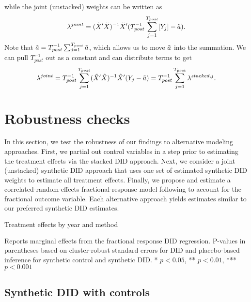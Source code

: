 \documentclass[12pt]{article}
\begin{document}
while the joint (unstacked) weights can be written as
\begin{align}
    \lambda^{joint} = (\Tilde{X}'\Tilde{X})^{-1}\Tilde{X}'(T^{-1}_{post} \sum_{j=1}^{T_{post}} [Y_j]-\Tilde{a}).
\end{align}
Note that \(\Tilde{a} = T^{-1}_{post} \sum_{j=1}^{T_{post}} \Tilde{a}\), which allows us to move \(\Tilde{a}\) into the summation.  We can pull \(T_{post}^{-1}\) out as a constant and can distribute terms to get 
\begin{align}
    \lambda^{joint} = T^{-1}_{post}\sum_{j=1}^{T_{post}}(\Tilde{X}'\Tilde{X})^{-1}\Tilde{X}'(Y_j-\Tilde{a}) = T^{-1}_{post}\sum_{j=1}^{T_{post}} \lambda^{stacked,j}.
\end{align}

\section{Robustness checks} \label{sec:robustness}

In this section, we test the robustness of our findings to alternative modeling approaches.  First, we partial out control variables in a step prior to estimating the treatment effects via the stacked DID approach.  Next, we consider a joint (unstacked) synthetic DID approach that uses one set of estimated synthetic DID weights to estimate all treatment effects.  Finally, we propose and estimate a correlated-random-effects fractional-response model following \cite{papkewooldridge2008} to account for the fractional outcome variable.  Each alternative approach yields estimates similar to our preferred synthetic DID estimates.

\begin{table}
    \centering
    \begin{threeparttable}
    \caption{Treatment effects by year and method}
    \label{tab:robustness}
    
    \begin{tablenotes}[flushleft]
    \scriptsize{Reports marginal effects from the fractional response DID regression.  P-values in parentheses based on cluster-robust standard errors for DID and placebo-based inference for synthetic control and synthetic DID. * \(p<0.05\), ** \(p<0.01\), *** \(p<0.001\)}
    \end{tablenotes}
    \end{threeparttable}
\end{table}

\subsection{Synthetic DID with controls}
\end{document}
